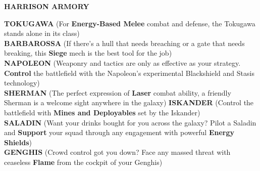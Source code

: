 \begin{center}
  \textbf{HARRISON ARMORY}
\end{center}  

\textbf{TOKUGAWA} (For \textbf{Energy-Based Melee} combat and defense, the Tokugawa stands alone in its class)\\
\textbf{BARBAROSSA} (If there’s a hull that needs breaching or a gate that needs breaking, this \textbf{Siege} mech is the best tool for the job)\\
\textbf{NAPOLEON} (Weaponry and tactics are only as effective as your strategy. \textbf{Control} the battlefield with the Napoleon’s experimental Blackshield and Stasis technology)\\ 
\textbf{SHERMAN} (The perfect expression of \textbf{Laser} combat ability, a friendly Sherman is a welcome sight anywhere in the galaxy)
\textbf{ISKANDER} (Control the battlefield with \textbf{Mines and Deployables} set by the Iskander)\\
\textbf{SALADIN} (Want your drinks bought for you across the galaxy? Pilot a Saladin and \textbf{Support} your squad through any engagement with powerful \textbf{Energy Shields})\\
\textbf{GENGHIS} (Crowd control got you down? Face any massed threat with ceaseless \textbf{Flame} from the cockpit of your Genghis) 
